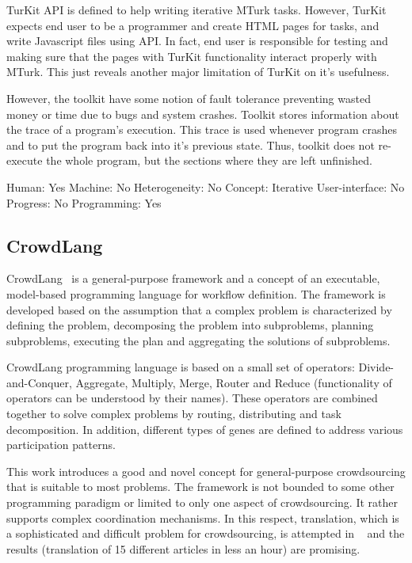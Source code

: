 TurKit API is defined to help writing iterative MTurk tasks. However, TurKit expects 
end user to be a programmer and create HTML pages for tasks, and write 
Javascript files using API. In fact, end user is responsible for testing and making 
sure that the pages with TurKit functionality interact properly with MTurk. 
This just reveals another major limitation of TurKit on it's usefulness.

However, the toolkit have some notion of fault tolerance preventing wasted 
money or time due to bugs and system crashes. Toolkit stores information about 
the trace of a program's execution. This trace is used whenever program crashes 
and to put the program back into it's previous state. Thus, toolkit does not 
re-execute the whole program, but the sections where they are left unfinished.

Human: Yes
Machine: No
Heterogeneity: No
Concept: Iterative
User-interface: No
Progress: No
Programming: Yes

\subsection{CrowdLang}
CrowdLang~\cite{Minder2011} is a general-purpose framework and a concept of 
an executable, model-based programming language for workflow definition. The 
framework is developed based on the assumption that a complex problem is 
characterized by defining the problem, decomposing the problem into subproblems, 
planning subproblems, executing the plan and aggregating the solutions of subproblems.

CrowdLang programming language is based on a small set of operators: 
Divide-and-Conquer, Aggregate, Multiply, Merge, Router and Reduce 
(functionality of operators can be understood by their names). These operators 
are combined together to solve complex problems by routing, distributing and 
task decomposition. In addition, different types of genes are defined to address 
various participation patterns.

This work introduces a good and novel concept for general-purpose crowdsourcing 
that is suitable to most problems. The framework is not bounded to some other 
programming paradigm or limited to only one aspect of crowdsourcing. It rather 
supports complex coordination mechanisms. In this respect, translation, which is a 
sophisticated and difficult problem for crowdsourcing, is attempted in ~\cite{Minder2012} 
and the results (translation of 15 different articles in less an hour) are promising.

